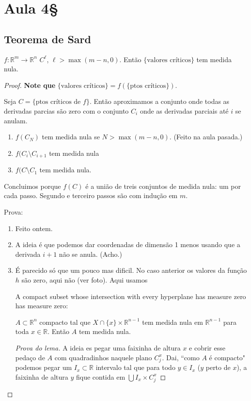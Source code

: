 \section{Aula 4§}

\subsection{Teorema de Sard}

\begin{thm}[Sard]\leavevmode
\(f: \mathbb{R}^m \to \mathbb{R}^n\) \(C^\ell\), \(\ell >  \operatorname{max}(m-n,0)\). Então \(\{\text{valores críticos} \}\) tem medida nula.
\end{thm}

\begin{proof}\leavevmode
\textbf{Note que} \(\{\text{valores críticos} \}=f(\{\text{ptos críticos} \})\).

Seja \(C=\{\text{ptos críticos de $f$} \}\). Então aproximamos a conjunto onde todas as derivadas parcias são zero com o conjunto \(C_i\) onde as derivadas parciais até \(i\) se anulam. 
\begin{enumerate}[label=\textbf{Passo \arabic*}]
\item \(f(C_N)\) tem medida nula se \(N>\operatorname{max}(m-n,0)\). {\color{6}(Feito na aula pasada.)}
\item \(f(C_i\setminus C_{i+1}\) tem medida nula
\item \(f(C\setminus C_1\) tem medida nula.
\end{enumerate}
Concluimos porque \(f(C)\) é a união de treis conjuntos de medida nula: um por cada passo. Segundo e terceiro passos são com indução em $m$.

Prova:
\begin{enumerate}[label=\textbf{Passo \arabic*}]
\item Feito ontem.
\item A ideia é que podemos dar coordenadas de dimensão 1 menos usando que a derivada \(i+1\) não se anula. (Acho.)
\item É parecido só que um pouco mas dificil. No caso anterior os valores da função \(h\) são zero, aqui não (ver foto). Aqui usamos
	\begin{lemma}\leavevmode
A compact subset whose intersection with every hyperplane has measure zero has measure zero:

\(A \subset\mathbb{R}^n\) compacto tal que \(X \cap \{ x \}\times \mathbb{R}^{n-1}\) tem medida nula em \(\mathbb{R}^{n-1}\) para toda \(x \in \mathbb{R}\). Então \(A\) tem medida nula.
	\end{lemma}
	\begin{proof}[Prova do lema]\leavevmode
	A ideia es pegar uma faixinha de altura $x$ e cobrir esse pedaço de \(A\) com quadradinhos naquele plano \(C^x_j\). Dai, ``como \(A\) é compacto" podemos pegar um \(I_x \subset \mathbb{R}\) intervalo tal que para todo \(y \in I_x\) ($y$ perto de \(x\)), a faixinha de altura $y$ fique contida em \(\bigcup I_x \times C_j^x\)


\end{proof}
\end{enumerate}
\end{proof}
